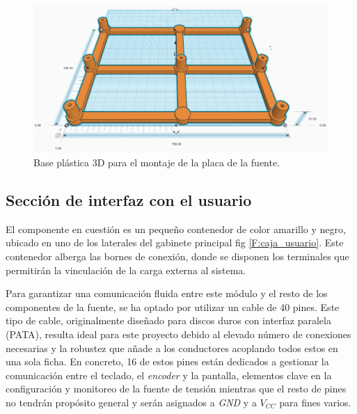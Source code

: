 \begin{figure}[H]
    \centering
    \includegraphics[scale=0.4]{./imagenes/3d_base.jpg}
    \caption{Base plástica 3D para el montaje de la placa de la fuente.}
    \label{F:base3d_fuente}
\end{figure}

\subsection{Sección de interfaz con el usuario}
El componente en cuestión es un pequeño contenedor de color amarillo y negro, ubicado en uno de los laterales del gabinete principal fig \ref{F:caja_usuario}. Este contenedor alberga las bornes de conexión, donde se disponen los terminales que permitirán la vinculación de la carga externa al sistema. \par
Para garantizar una comunicación fluida entre este módulo y el resto de los componentes de la fuente, se ha optado por utilizar un cable de 40 pines. Este tipo de cable, originalmente diseñado para discos duros con interfaz paralela (PATA), resulta ideal para este proyecto debido al elevado número de conexiones necesarias y la robustez que añade a los conductores acoplando todos estos en una sola ficha. En concreto, 16 de estos pines están dedicados a gestionar la comunicación entre el teclado, el \textit{encoder} y la pantalla, elementos clave en la configuración y monitoreo de la fuente de tensión mientras que el resto de pines no tendrán propósito general y serán asignados a \textit{GND} y a \textit{$V_{CC}$} para fines varios. \par

